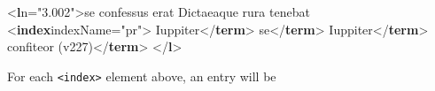 \documentclass[11pt,twoside]{article}\makeatletter
\begin{document}
\begin{shaded}
{<\textbf{l}\hspace*{1em}n="{3.002}">}se confessus erat Dictaeaque rura tenebat\mbox{}\newline 
{<\textbf{index}\hspace*{1em}indexName="{pr}">}\mbox{}\newline 
\hspace*{1em}Iuppiter{</\textbf{term}>}\mbox{}\newline 
\hspace*{1em}\mbox{}\newline 
\hspace*{1em}\hspace*{1em}se{</\textbf{term}>}\mbox{}\newline 
\hspace*{1em}\mbox{}\newline 
{}\mbox{}\newline 
{}\mbox{}\newline 
\hspace*{1em}Iuppiter{</\textbf{term}>}\mbox{}\newline 
\hspace*{1em}\mbox{}\newline 
\hspace*{1em}\hspace*{1em}confiteor (v227){</\textbf{term}>}\mbox{}\newline 
\hspace*{1em}\mbox{}\newline 
{}\mbox{}\newline 
{</\textbf{l}>}\end{shaded}\egroup\par \noindent   For each \texttt{<index>} element above, an entry will be
\end{document}
